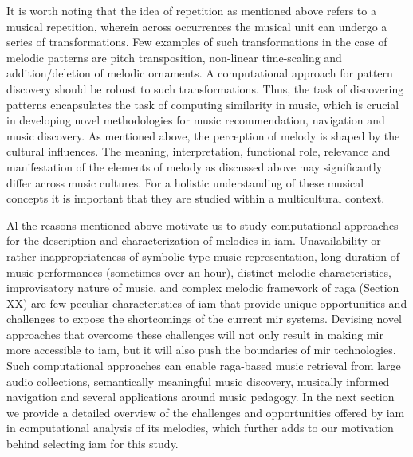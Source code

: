 It is worth noting that the idea of repetition as mentioned above refers to a musical repetition, wherein across occurrences the musical unit can undergo a series of transformations. Few examples of such transformations in the case of melodic patterns are pitch transposition, non-linear time-scaling and addition/deletion of melodic ornaments. A computational approach for pattern discovery should be robust to such transformations. Thus, the task of discovering patterns encapsulates the task of computing similarity in music, which is crucial in developing novel methodologies for music recommendation, navigation and music discovery. As mentioned above, the perception of melody is shaped by the cultural influences. The meaning, interpretation, functional role, relevance and manifestation of the elements of melody as discussed above may significantly differ across music cultures. For a holistic understanding of these musical concepts it is important that they are studied within a multicultural context. 

Al the reasons mentioned above motivate us to study computational approaches for the description and characterization of melodies in \gls{iam}. Unavailability or rather inappropriateness of symbolic type music representation, long duration of music performances (sometimes over an hour), distinct melodic characteristics, improvisatory nature of music, and complex melodic framework of \gls{raga} (Section XX) are few peculiar characteristics of \gls{iam} that provide unique opportunities and challenges to expose the shortcomings of the current \gls{mir} systems. Devising novel approaches that overcome these challenges will not only result in making \gls{mir} more accessible to \gls{iam}, but it will also push the boundaries of \gls{mir} technologies. Such computational approaches can enable \gls{raga}-based music retrieval from large audio collections, semantically meaningful music discovery, musically informed navigation and several applications around music pedagogy. In the next section we provide a detailed overview of the challenges and opportunities offered by \gls{iam} in computational analysis of its melodies, which further adds to our motivation behind selecting \gls{iam} for this study.







